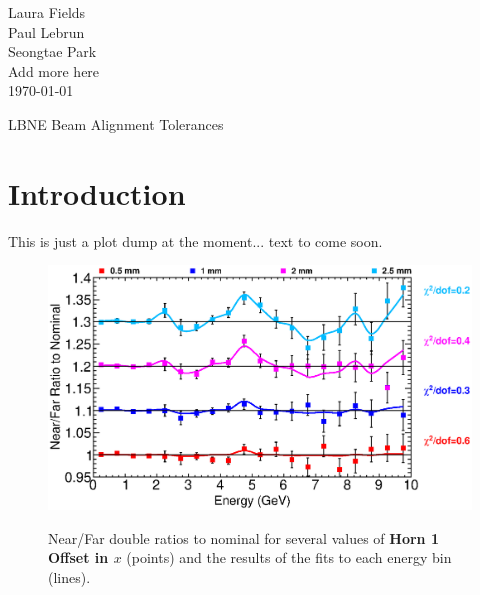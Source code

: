 



\begin{flushright}
Laura Fields\\
Paul Lebrun \\
Seongtae Park \\
Add more here \\
\today
\end{flushright}

\begin{center}

{\LARGE LBNE Beam Alignment Tolerances}
\end{center}



\section{Introduction}

This is just a plot dump at the moment... text to come soon.

\vspace{3in}


\begin{figure}[ht]
  \begin{center}
    {\includegraphics[width=6.0in]{figures/Horn1XOffset_nof_summary.eps}}
  \end{center}
\caption{ Near/Far double ratios to nominal for several values of {\bf Horn 1 Offset in $x$} (points) and the results of the fits to each energy bin (lines).}
\end{figure}

